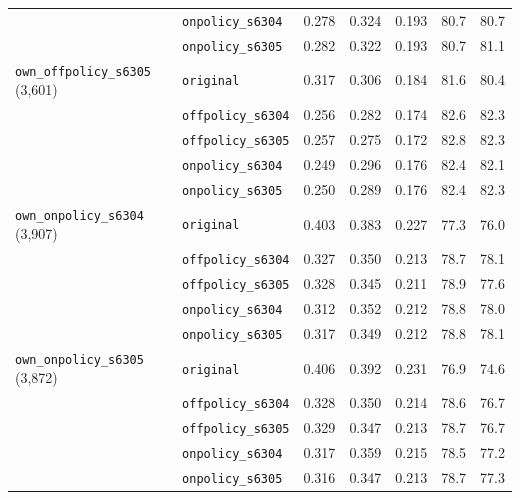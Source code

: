 \documentclass{article}
\begin{document}
\begin{table}[H]
\begin{tabular}{llccccc}
 & \texttt{onpolicy\_s6304} & 0.278 & 0.324 & 0.193 & 80.7 & 80.7 \\
 & \texttt{onpolicy\_s6305} & 0.282 & 0.322 & 0.193 & 80.7 & 81.1 \\
\midrule
\texttt{own\_offpolicy\_s6305} (3,601) & \texttt{original} & 0.317 & 0.306 & 0.184 & 81.6 & 80.4 \\
 & \texttt{offpolicy\_s6304} & 0.256 & 0.282 & 0.174 & 82.6 & 82.3 \\
 & \texttt{offpolicy\_s6305} & 0.257 & 0.275 & 0.172 & 82.8 & 82.3 \\
 & \texttt{onpolicy\_s6304} & 0.249 & 0.296 & 0.176 & 82.4 & 82.1 \\
 & \texttt{onpolicy\_s6305} & 0.250 & 0.289 & 0.176 & 82.4 & 82.3 \\
\midrule
\texttt{own\_onpolicy\_s6304} (3,907) & \texttt{original} & 0.403 & 0.383 & 0.227 & 77.3 & 76.0 \\
 & \texttt{offpolicy\_s6304} & 0.327 & 0.350 & 0.213 & 78.7 & 78.1 \\
 & \texttt{offpolicy\_s6305} & 0.328 & 0.345 & 0.211 & 78.9 & 77.6 \\
 & \texttt{onpolicy\_s6304} & 0.312 & 0.352 & 0.212 & 78.8 & 78.0 \\
 & \texttt{onpolicy\_s6305} & 0.317 & 0.349 & 0.212 & 78.8 & 78.1 \\
\midrule
\texttt{own\_onpolicy\_s6305} (3,872) & \texttt{original} & 0.406 & 0.392 & 0.231 & 76.9 & 74.6 \\
 & \texttt{offpolicy\_s6304} & 0.328 & 0.350 & 0.214 & 78.6 & 76.7 \\
 & \texttt{offpolicy\_s6305} & 0.329 & 0.347 & 0.213 & 78.7 & 76.7 \\
 & \texttt{onpolicy\_s6304} & 0.317 & 0.359 & 0.215 & 78.5 & 77.2 \\
 & \texttt{onpolicy\_s6305} & 0.316 & 0.347 & 0.213 & 78.7 & 77.3 \\
\bottomrule
\end{tabular}
\end{table}
\end{document}
